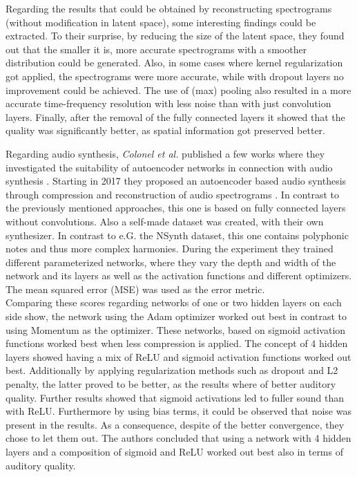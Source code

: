 Regarding the results that could be obtained by reconstructing spectrograms (without modification in latent space), some interesting findings could be extracted. To their surprise, by reducing the size of the latent space, they found out that the smaller it is, more accurate spectrograms with a smoother distribution could be generated. Also, in some cases where kernel regularization got applied, the spectrograms were more accurate, while with dropout layers no improvement could be achieved. The use of (max) pooling also resulted in a more accurate time-frequency resolution with less noise than with just convolution layers. Finally, after the removal of the fully connected  layers it showed that the quality was significantly better, as spatial information got preserved better.

Regarding audio synthesis, \textit{Colonel et al.} published a few works where they investigated the suitability of autoencoder networks in connection with audio synthesis \cite{colonel2017improving, colonel2018autoencoding, Colonel2020}. Starting in 2017 they proposed an autoencoder based audio synthesis through compression and reconstruction of audio spectrograms \cite{colonel2017improving}. In contrast to the previously mentioned approaches, this one is based on fully connected layers without convolutions. Also a self-made dataset was created, with their own synthesizer. In contrast to e.G. the NSynth dataset, this one contains polyphonic notes and thus more complex harmonies. During the experiment they trained different parameterized networks, where they vary the depth and width of the network and its layers as well as the activation functions and different optimizers. The mean squared error (MSE) was used as the error metric.\\
Comparing these scores regarding networks of one or two hidden layers on each side show, the network using the Adam optimizer worked out best in contrast to using Momentum as the optimizer. These networks, based on sigmoid activation functions worked best when less compression is applied. The concept of 4 hidden layers showed having a mix of ReLU and sigmoid activation functions worked out best. Additionally by applying regularization methods such as dropout and L2 penalty, the latter proved to be better, as the results where of better auditory quality. Further results showed that sigmoid activations led to fuller sound than with ReLU. Furthermore by using bias terms, it could be observed that noise was present in the results. As a consequence, despite of the better convergence, they chose to let them out. The authors concluded  that using a network with 4 hidden layers and a composition of sigmoid and ReLU worked out best also in terms of auditory quality.

